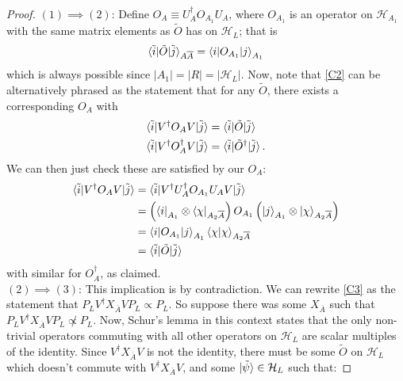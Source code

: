 \documentclass[12pt,a4paper]{report}
\numberwithin{equation}{section}
\newcommand{\ol}[1]{\overline{#1}}
\theoremstyle{definition}
\theoremstyle{theorem}
\theoremstyle{theorem}
\theoremstyle{example}
\theoremstyle{definition}
\begin{document}
\newcommand{\Xabar}{X_{\overline{A}}}
\begin{proof}
	$(1)\implies(2)$: Define $O_{A}\equiv U_{A}^{\dagger}O_{A_{1}}U_{A}$, where $O_{A_{1}}$ is an operator on $\mathcal{H}_{A_{1}}$ with the same matrix elements as $\tilde{O}$ has on $\mathcal{H}_{L}$; that is
	\begin{equation*}
		\braket{\tilde{i}|\tilde{O}|\tilde{j}}_{A\ol{A}}=\braket{i|O_{A_{1}}|j}_{A_{1}}
	\end{equation*}
	which is always possible since $|A_{1}|=|R|=|\mathcal{H}_{L}|$. Now, note that \ref{C2} can be alternatively phrased as the statement that for any $\tilde{O}$, there exists a corresponding $O_{A}$ with
	\begin{equation}
		\begin{aligned}
			\braket{\tilde{i}|V^{\dagger}O_{A}V|\tilde{j}}&=\braket{\tilde{i}|\tilde{O}|\tilde{j}}\\
			\braket{\tilde{i}|V^{\dagger}O_{A}^{\dagger}V|\tilde{j}}&=\braket{\tilde{i}|\tilde{O}^{\dagger}|\tilde{j}}.
		\end{aligned}
	\end{equation}
	We can then just check these are satisfied by our $O_{A}$:
	\begin{equation}
		\begin{aligned}
			\braket{\tilde{i}|V^{\dagger}O_{A}V|\tilde{j}}&=\braket{\tilde{i}|V^{\dagger}U_{A}^{\dagger}O_{A_{1}}U_{A}V|\tilde{j}}\\&=\left(\bra{i}_{A_{1}}\otimes\bra{\chi}_{A_{2}\ol{A}}\right)O_{A_{1}}\left(\ket{j}_{A_{1}}\otimes\ket{\chi}_{A_{2}\ol{A}}\right)\\&=\braket{i|O_{A_{1}}|j}_{A_{1}}\braket{\chi|\chi}_{A_{2}\ol{A}}\\&=\braket{\tilde{i}|\tilde{O}|\tilde{j}}
		\end{aligned}
	\end{equation}
	with similar for $O_{A}^{\dagger}$, as claimed.\\
	$(2)\implies(3)$: This implication is by contradiction. We can rewrite \ref{C3} as the statement that $P_{L}V^{\dagger}\Xabar VP_{L}\propto P_{L}$. So suppose there was some $X_{\ol{A}}$ such that $P_{L}V^{\dagger} X_{\ol{A}}VP_{L} \not\propto P_{L}$. Now, Schur's lemma in this context states that the only non-trivial operators commuting with all other operators on $\mathcal{H}_{L}$ are scalar multiples of the identity. Since $V^{\dagger}X_{\ol{A}}V$ is not the identity, there must be some $\tilde{O}$ on $\mathcal{H}_{L}$ which doesn't commute with $V^{\dagger}X_{\ol{A}}V$, and some $\ket{\tilde{\psi}}\in\mathcal{H}_{L}$ such that:

\end{proof}
\end{document}
